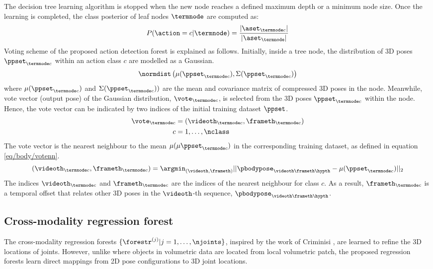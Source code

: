 The decision tree learning algorithm is stopped when the new node reaches a defined maximum depth or a minimum node size. Once the learning is completed, the class posterior of leaf nodes $\termnode$ are computed as:  
\begin{equation}
	\label{eq/body/dforest_treeposterior}
	P(\action = c| \termnode) = \frac{|\aset_{\termnode c}|}{| \aset_{\termnode}|}
\end{equation}
Voting scheme of the proposed action detection forest is explained as follows. 
Initially, inside a tree node, the distribution of 3D poses $\ppset_{\termnode c}$ within an action class $c$ are modelled as a Gaussian. 
\begin{equation}
	\label{eq/body/nodegaussian}
	\normdist\left(\mu({\ppset}_{\termnode c}), \Sigma(\ppset_{\termnode c})\right)
\end{equation} 
where $\mu({\ppset}_{\termnode c})$ and $\Sigma(\ppset_{\termnode c}))$ are the mean and covariance matrix of compressed 3D poses in the node. 
Meanwhile, vote vector (output pose) of the Gaussian distribution, $\vote_{\termnode c}$, is selected from the 3D poses $\ppset_{\termnode c}$ within the node. Hence, the vote vector can be indicated by two indices of the initial training dataset $\ppset$.  
\begin{equation}
	\label{eq/body/votevector}
	\begin{aligned}
		\vote_{\termnode c} & = \left( \videoth_{\termnode c}, \frameth_{\termnode c}\right) \\ 
		c & = 1,\dots,\nclass
	\end{aligned}
\end{equation} 
The vote vector is the nearest neighbour to the mean $\mu(\mu{\ppset}_{\termnode c})$ in the corresponding training dataset, as defined in equation \ref{eq/body/votenn}. 
\begin{equation}
	\label{eq/body/votenn}
	\left(\videoth_{\termnode c}, \frameth_{\termnode c}\right) =  
	\displaystyle\argmin_{(\videoth, \frameth)} || \pbodypose_{\videoth\frameth\hypth} - \mu({\ppset}_{\termnode c}) ||_{2}
\end{equation}
The indices $\videoth_{\termnode c}$ and $\frameth_{\termnode c}$ are the indices of the nearest neighbour for class $c$.   
As a result, $\frameth_{\termnode c}$ is a temporal offset that relates other 3D poses in the $\videoth$-th sequence, \ie $\pbodypose_{\videoth\frameth\hypth}$.

\subsection{Cross-modality regression forest}
\label{sec/body/jrflearn}
The cross-modality regression forests $\{\forestr^{(j)}|{j} = 1,\dots,\njoints\}$, inspired by the work of Criminisi \etal \cite{Criminisi2011}, are learned to refine the 3D locations of joints. However, unlike \cite{Criminisi2011} where objects in volumetric data are located from local volumetric patch, the proposed regression forests learn direct mappings from 2D pose configurations to 3D joint locations.


